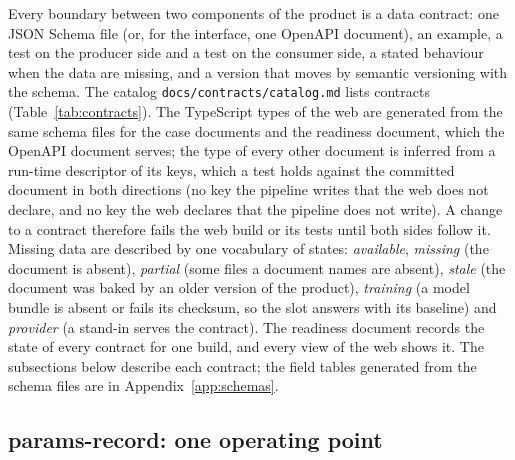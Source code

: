 Every boundary between two components of the product is a data contract: one JSON Schema file (or, for the interface, one
OpenAPI document), an example, a test on the producer side and a test on the consumer side, a stated behaviour when the data
are missing, and a version that moves by semantic versioning with the schema. The catalog
\texttt{docs/\allowbreak{}contracts/\allowbreak{}catalog.md} lists \ncontracts{} contracts (Table~\ref{tab:contracts}). The TypeScript types of the web are
generated from the same schema files for the case documents and the readiness document, which the OpenAPI document serves; the
type of every other document is inferred from a run-time descriptor of its keys, which a test holds against the committed
document in both directions (no key the pipeline writes that the web does not declare, and no key the web declares that the
pipeline does not write). A change to a contract therefore fails the web build or its tests until both sides follow it. Missing data
are described by one vocabulary of states: \emph{available}, \emph{missing} (the document is absent), \emph{partial} (some
files a document names are absent), \emph{stale} (the document was baked by an older version of the product), \emph{training}
(a model bundle is absent or fails its checksum, so the slot answers with its baseline) and \emph{provider} (a stand-in serves
the contract). The readiness document records the state of every contract for one build, and every view of the web shows it.
The subsections below describe each contract; the field tables generated from the schema files are in
Appendix~\ref{app:schemas}.

\begin{table}[!t]
\centering
\caption{The \ncontracts{} data contracts of the product, generated from the catalog: identifier, version, producing module,
schema file and status in the committed build. Their fields are listed in Appendix~\ref{app:schemas}.}
\label{tab:contracts}
\footnotesize

\end{table}

\subsection{params-record: one operating point}\label{sec:data-params}

